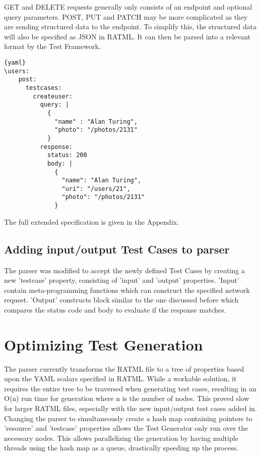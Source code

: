 GET and DELETE requests generally only consists of an endpoint and optional query parameters. POST, PUT and PATCH may be more complicated as they are sending structured data to the endpoint. To simplify this, the structured data will also be specified as JSON in RATML. It can then be parsed into a relevant format by the Test Framework.

\begin{lstlisting}[frame=lines]{yaml}
\users:
    post:
      testcases:
        createuser:
          query: |
            {
              "name" : "Alan Turing",
              "photo": "/photos/2131"
            }
          response: 
            status: 200
            body: |
              {
              	"name": "Alan Turing",
              	"uri": "/users/21",
              	"photo": "/photos/2131"
              }
\end{lstlisting}

The full extended specification is given in the Appendix.

\subsection{Adding input/output Test Cases to parser}

The parser was modified to accept the newly defined Test Cases by creating a new 'testcase' property, consisting of 'input' and 'output' properties. 'Input' contain meta-programming functions which can construct the specified network request. 'Output' constructs block similar to the one discussed before which compares the status code and body to evaluate if the response matches.

\section{Optimizing Test Generation}

The parser currently transforms the RATML file to a tree of properties based upon the YAML scalars specified in RATML. While a workable solution, it requires the entire tree to be traversed when generating test cases, resulting in an O(n) run time for generation where n is the number of nodes. This proved slow for larger RATML files, especially with the new input/output test cases added in. Changing the parser to simultaneously create a hash map containing pointers to 'resource' and 'testcase' properties allows the Test Generator only run over the necessary nodes. This allows parallelizing the generation by having multiple threads using the hash map as a queue, drastically speeding up the process.


